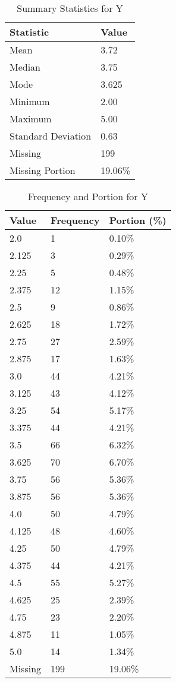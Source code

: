 \begin{table}[H]
\centering
\begin{tabular}{|l|l|}
\hline
\textbf{Statistic} & \textbf{Value} \\ \hline
Mean               & 3.72 \\ \hline
Median             & 3.75 \\ \hline
Mode               & 3.625 \\ \hline
Minimum            & 2.00 \\ \hline
Maximum            & 5.00 \\ \hline
Standard Deviation & 0.63 \\ \hline
Missing            & 199 \\ \hline
Missing Portion    & 19.06\% \\ \hline
\end{tabular}
\caption{Summary Statistics for Y}
\end{table}

\begin{table}[H]
\centering
\begin{tabular}{|l|l|l|}
\hline
\textbf{Value} & \textbf{Frequency} & \textbf{Portion (\%)} \\ \hline
2.0 & 1 & 0.10\% \\ \hline
2.125 & 3 & 0.29\% \\ \hline
2.25 & 5 & 0.48\% \\ \hline
2.375 & 12 & 1.15\% \\ \hline
2.5 & 9 & 0.86\% \\ \hline
2.625 & 18 & 1.72\% \\ \hline
2.75 & 27 & 2.59\% \\ \hline
2.875 & 17 & 1.63\% \\ \hline
3.0 & 44 & 4.21\% \\ \hline
3.125 & 43 & 4.12\% \\ \hline
3.25 & 54 & 5.17\% \\ \hline
3.375 & 44 & 4.21\% \\ \hline
3.5 & 66 & 6.32\% \\ \hline
3.625 & 70 & 6.70\% \\ \hline
3.75 & 56 & 5.36\% \\ \hline
3.875 & 56 & 5.36\% \\ \hline
4.0 & 50 & 4.79\% \\ \hline
4.125 & 48 & 4.60\% \\ \hline
4.25 & 50 & 4.79\% \\ \hline
4.375 & 44 & 4.21\% \\ \hline
4.5 & 55 & 5.27\% \\ \hline
4.625 & 25 & 2.39\% \\ \hline
4.75 & 23 & 2.20\% \\ \hline
4.875 & 11 & 1.05\% \\ \hline
5.0 & 14 & 1.34\% \\ \hline
Missing & 199 & 19.06\% \\ \hline
\end{tabular}
\caption{Frequency and Portion for Y}
\end{table}
